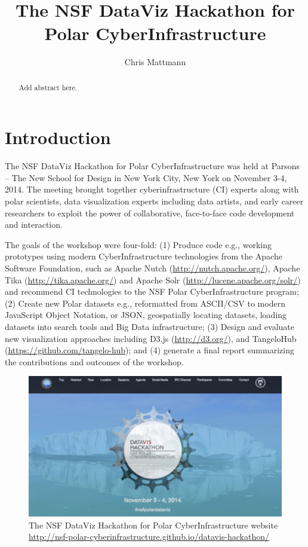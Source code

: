\documentclass[11pt]{article}
\begin{document}
\title{The NSF DataViz Hackathon for Polar CyberInfrastructure}
\author{Chris Mattmann}

\maketitle
\begin{abstract}
Add abstract here.
\end{abstract}


\section{Introduction}
The NSF DataViz Hackathon for Polar CyberInfrastructure was held at Parsons -- The New School for Design in New York City, New York on November 3-4, 2014. The meeting brought together cyberinfrastructure (CI) experts along with polar scientists, data visualization experts including data artists, and early career researchers to exploit the power of collaborative, face-to-face code development and interaction. 

The goals of the workshop were four-fold: (1) Produce code e.g., working prototypes using modern CyberInfrastructure technologies from the Apache Software Foundation, such as Apache Nutch (\url{http://nutch.apache.org/}), Apache Tika (\url{http://tika.apache.org/}) and Apache Solr (\url{http://lucene.apache.org/solr/}) and recommend CI technologies to the NSF Polar CyberInfrastructure program; (2) Create new Polar datasets e.g., reformatted from ASCII/CSV to modern JavaScript Object Notation, or JSON, geospatially locating datasets, loading datasets into search tools and Big Data infrastructure; (3) Design and evaluate new visualization approaches including D3.js (\url{http://d3.org/}), and TangeloHub (\url{https://github.com/tangelo-hub}); and (4) generate a final report summarizing the contributions and outcomes of the workshop. 

\begin{figure}[htp]
    \centering
    \includegraphics[width=5in]{figs/fig1.png}
    \caption{The NSF DataViz Hackathon for Polar CyberInfrastructure website \protect\url{http://nsf-polar-cyberinfrastructure.github.io/datavis-hackathon/}}
    \label{fig:website}
\end{figure}
\end{document}
